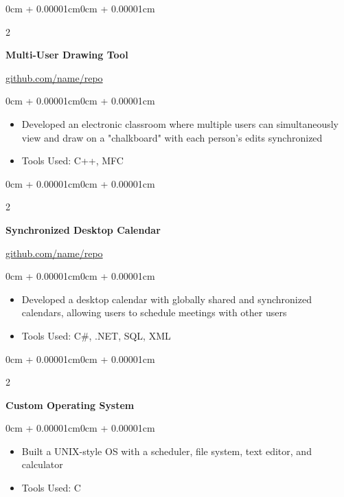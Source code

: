 \documentclass[10pt, letterpaper]{article}
\newenvironment{highlights}{
  \begin{itemize}[
    topsep=0.10cm,
    parsep=0.10cm,
    partopsep=0pt,
    itemsep=0pt,
    leftmargin=0cm + 10pt
  ]
}{
  \end{itemize}
}
\newenvironment{onecolentry}{
  \begin{adjustwidth}{0cm + 0.00001cm}{0cm + 0.00001cm}
}{
  \end{adjustwidth}
}
\newenvironment{twocolentry}[2][]{
  \onecolentry
  \def\secondColumn{#2}
  \setcolumnwidth{\fill, 4.5cm}
  \begin{paracol}{2}
}{
  \switchcolumn \raggedleft \secondColumn
  \end{paracol}
  \endonecolentry
}
\begin{document}
\begin{twocolentry}{\href{https://github.com/sinaatalay/rendercv}{github.com/name/repo}}
    \textbf{Multi-User Drawing Tool}
\end{twocolentry}

\vspace{0.10cm}

\begin{onecolentry}
    \begin{highlights}
        \item Developed an electronic classroom where multiple users can simultaneously view and draw on a "chalkboard" with each person's edits synchronized
        \item Tools Used: C++, MFC
    \end{highlights}
\end{onecolentry}

\vspace{0.2cm}

\begin{twocolentry}{\href{https://github.com/sinaatalay/rendercv}{github.com/name/repo}}
    \textbf{Synchronized Desktop Calendar}
\end{twocolentry}

\vspace{0.10cm}

\begin{onecolentry}
    \begin{highlights}
        \item Developed a desktop calendar with globally shared and synchronized calendars, allowing users to schedule meetings with other users
        \item Tools Used: C\#, .NET, SQL, XML
    \end{highlights}
\end{onecolentry}

\vspace{0.2cm}

\begin{twocolentry}{2002}
    \textbf{Custom Operating System}
\end{twocolentry}

\vspace{0.10cm}

\begin{onecolentry}
    \begin{highlights}
        \item Built a UNIX-style OS with a scheduler, file system, text editor, and calculator
        \item Tools Used: C
    \end{highlights}
\end{onecolentry}
\end{document}
